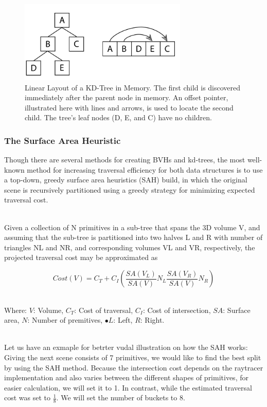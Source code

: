 \documentclass[11pt,a4paper]{article}
\begin{document}
\begin{figure}[h]	
     \centering
     \captionsetup{justification=centering,margin=2cm}
     \includegraphics[width=8cm]{images/kdtree/compact.png}
     \caption{Linear Layout of a KD-Tree in Memory. The  first child is discovered immediately after the parent node in memory. An offset pointer, illustrated here with lines and arrows, is used to locate the second child. The tree's leaf nodes (D, E, and C) have no children.\protect\cite{Pharr2016}}
        \label{fig:dice}
\end{figure}


\subsubsection{The Surface Area Heuristic}
Though there are several methods for creating BVHs and kd-trees, the most well-known method for increasing traversal efficiency for both data structures is to use a top-down, greedy surface area heuristics (SAH) build, in which the original scene is recursively partitioned using a greedy strategy for minimizing expected traversal cost. 

\noindent
\\
Given a collection of N primitives in a sub-tree that spans the 3D volume V, and assuming that the sub-tree is partitioned into two halves L and R with number of triangles NL and NR, and corresponding volumes VL and VR, respectively, the projected traversal cost may be approximated as

\begin{equation}
Cost(V) = C_T + C_I(\frac{SA(V_L)}{SA(V)}N_L \frac{SA(V_R)}{SA(V)}N_R)
\end{equation}

\noindent
\\
Where: $V$: Volume, $C_T$: Cost of traversal, $C_I$: Cost of intersection, $SA$: Surface area, $N$: Number of premitives, $•L$: Left, $R$: Right.

\noindent
\\
Let us have an exmaple for betrter vudal illustration on how the SAH works: 
\noindent
\\
Giving the next scene consists of 7 primitives, we would like to find the best split by using the SAH method. Because the intersection cost depends on the raytracer implementation and also varies between the different shapes of primitives, for easier calculation, we will set it to 1. In contrast, while the estimated traversal cost was set to $\frac{1}{8}$. We will set the number of buckets to 8.
\end{document}
